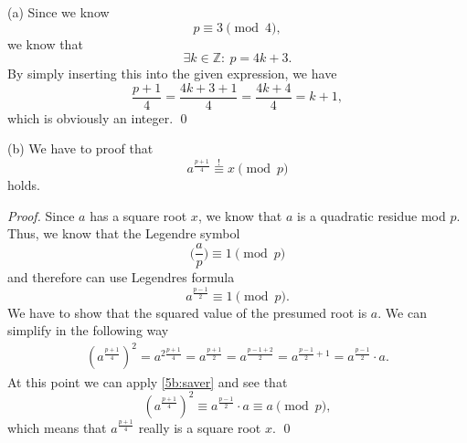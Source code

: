\documentclass[12pt]{article}
\begin{document}
  (a) Since we know \begin{equation}
 	p \equiv 3 \pmod{4},
 \end{equation} we know that \begin{equation} \label{task5:modp}
 	\exists k\in\mathbb{Z}:\ p=4k+3.
 \end{equation} By simply inserting this into the given expression, we have \begin{equation}
 	\frac{p+1}{4} = \frac{4k+3+1}{4} = \frac{4k+4}{4}=k+1, \label{5a:kp1}
 \end{equation} which is obviously an integer. \qed
 
  (b) We have to proof that \begin{equation}
 	a^{\frac{p+1}{4}}\overset{!}{\equiv}x \pmod{p}
 \end{equation} holds.
 

 \textit{Proof.} Since $a$ has a square root $x$, we know that $a$ is a quadratic residue mod $p$. Thus, we know that the Legendre symbol \begin{equation}
 	\bigg(\frac{a}{p}\bigg)\equiv 1\pmod{p}
 \end{equation} and therefore can use Legendres formula \begin{equation}
 	a^{\frac{p-1}{2}}\equiv 1\pmod{p}. \label{5b:saver}
 \end{equation} We have to show that the squared value of the presumed root is $a$. We can simplify in the following way \begin{gather}
 	(a^{\frac{p+1}{4}})^2=a^{2\frac{p+1}{4}}=a^{\frac{p+1}{2}}=a^{\frac{p-1+2}{2}}=a^{\frac{p-1}{2}+1}=a^{\frac{p-1}{2}}\cdot a.
 \end{gather} At this point we can apply \autoref{5b:saver} and see that \begin{equation}
 	(a^{\frac{p+1}{4}})^2\equiv a^{\frac{p-1}{2}}\cdot a\equiv a\pmod{p},
 \end{equation}
 which means that $a^{\frac{p+1}{4}}$ really is a square root $x$. \qed
 
\end{document}
